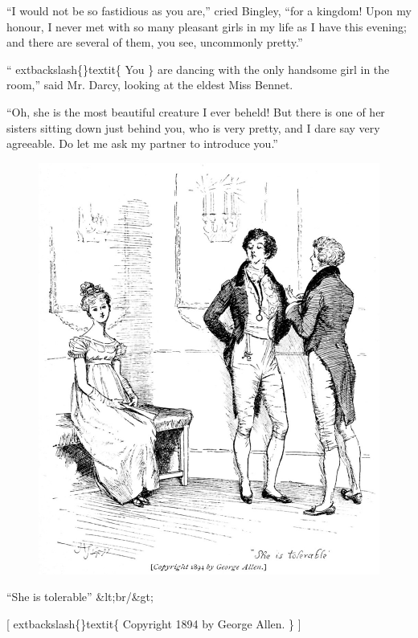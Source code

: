 \documentclass[10pt]{book}
\begin{document}
   “I would not be so fastidious as you are,” cried Bingley, “for a
kingdom! Upon my honour, I never met with so many pleasant girls in my
life as I have this evening; and there are several of them, you see,
uncommonly pretty.”
  

   “
   	extbackslash\{\}textit\{
    You
   \}
   are dancing with the only handsome girl in the room,” said Mr.
Darcy, looking at the eldest Miss Bennet.
  

   “Oh, she is the most beautiful creature I ever beheld!
   But there is one
of her sisters sitting down just behind you, who is very pretty, and I
dare say very agreeable. Do let me ask my partner to introduce you.”
  

\begin{figure}[h]
\centering
\includegraphics[width=\linewidth]{images/i_044.jpg}
\end{figure}

     “She is tolerable”
     &lt;br/&gt;

     [
     	extbackslash\{\}textit\{
      Copyright 1894 by George Allen.
     \}
     ]
    
\end{document}
